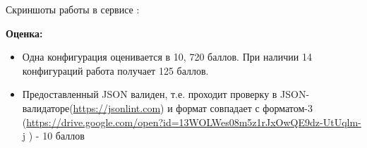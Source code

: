 Скриншоты работы в сервисе : 


\textbf{Оценка:}
\begin{itemize}
    \item	Одна конфигурация оценивается в 10, 720 баллов. При наличии 14 конфигураций работа получает 125 баллов.
    \item	Предоставленный JSON валиден, т.е. проходит проверку в JSON-валидаторе(\url{https://jsonlint.com}) и формат совпадает с форматом-3 (\url{https://drive.google.com/open?id=13WOLWes08m5z1rJxOwQE9dz-UtUqlm-j} ) - 10 баллов
\end{itemize}